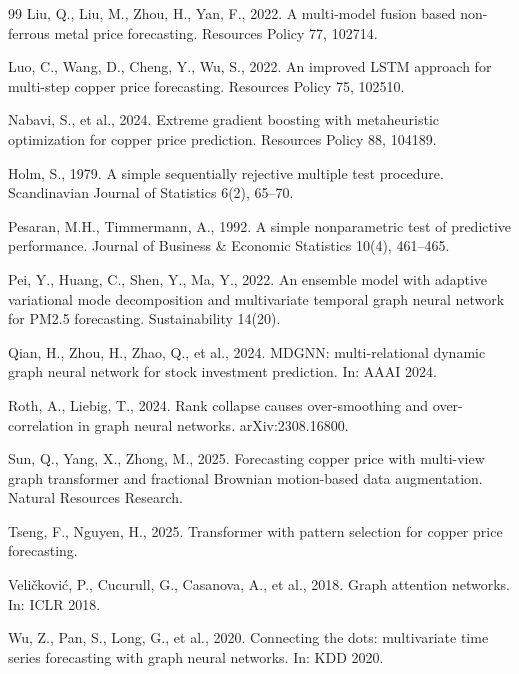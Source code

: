 \documentclass[journal]{IEEEtran}
\begin{document}
\begin{thebibliography}{99}
Liu, Q., Liu, M., Zhou, H., Yan, F., 2022. A multi-model fusion based non-ferrous metal price forecasting. Resources Policy 77, 102714.

Luo, C., Wang, D., Cheng, Y., Wu, S., 2022. An improved LSTM approach for multi-step copper price forecasting. Resources Policy 75, 102510.

Nabavi, S., et al., 2024. Extreme gradient boosting with metaheuristic optimization for copper price prediction. Resources Policy 88, 104189.

Holm, S., 1979. A simple sequentially rejective multiple test procedure. Scandinavian Journal of Statistics 6(2), 65--70.

Pesaran, M.H., Timmermann, A., 1992. A simple nonparametric test of predictive performance. Journal of Business \& Economic Statistics 10(4), 461--465.

Pei, Y., Huang, C., Shen, Y., Ma, Y., 2022. An ensemble model with adaptive variational mode decomposition and multivariate temporal graph neural network for PM2.5 forecasting. Sustainability 14(20).

Qian, H., Zhou, H., Zhao, Q., et al., 2024. MDGNN: multi-relational dynamic graph neural network for stock investment prediction. In: AAAI 2024.

Roth, A., Liebig, T., 2024. Rank collapse causes over-smoothing and over-correlation in graph neural networks. arXiv:2308.16800.

Sun, Q., Yang, X., Zhong, M., 2025. Forecasting copper price with multi-view graph transformer and fractional Brownian motion-based data augmentation. Natural Resources Research.

Tseng, F., Nguyen, H., 2025. Transformer with pattern selection for copper price forecasting.

Veli\v{c}kovi\'{c}, P., Cucurull, G., Casanova, A., et al., 2018. Graph attention networks. In: ICLR 2018.

Wu, Z., Pan, S., Long, G., et al., 2020. Connecting the dots: multivariate time series forecasting with graph neural networks. In: KDD 2020.


\end{thebibliography}
\end{document}
